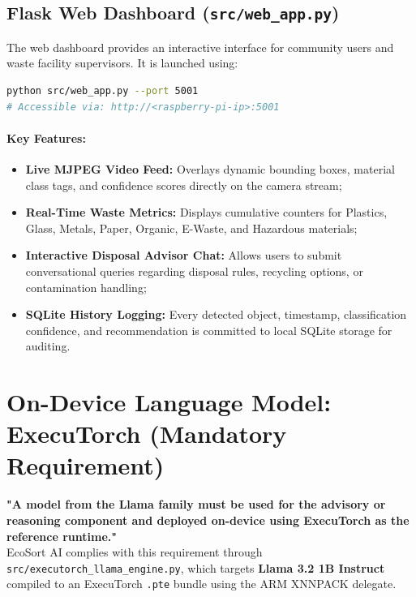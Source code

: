 \documentclass[12pt,a4paper]{article}
\begin{document}
\subsection{Flask Web Dashboard (\texttt{src/web\_app.py})}

The web dashboard provides an interactive interface for community users and waste facility
supervisors. It is launched using:
\begin{lstlisting}[language=bash]
python src/web_app.py --port 5001
# Accessible via: http://<raspberry-pi-ip>:5001
\end{lstlisting}

\paragraph{Key Features:}
\begin{itemize}[noitemsep]
  \item \textbf{Live MJPEG Video Feed:} Overlays dynamic bounding boxes, material class tags,
  and confidence scores directly on the camera stream;
  \item \textbf{Real-Time Waste Metrics:} Displays cumulative counters for Plastics, Glass,
  Metals, Paper, Organic, E-Waste, and Hazardous materials;
  \item \textbf{Interactive Disposal Advisor Chat:} Allows users to submit conversational queries
  regarding disposal rules, recycling options, or contamination handling;
  \item \textbf{SQLite History Logging:} Every detected object, timestamp, classification confidence,
  and recommendation is committed to local SQLite storage for auditing.
\end{itemize}

\clearpage

\section{On-Device Language Model: ExecuTorch (Mandatory Requirement)}

\begin{reqbox}
\textbf{"A model from the Llama family must be used for the advisory or reasoning component
and deployed on-device using ExecuTorch as the reference runtime."}\\[4pt]
EcoSort AI complies with this requirement through \texttt{src/executorch\_llama\_engine.py},
which targets \textbf{Llama 3.2 1B Instruct} compiled to an ExecuTorch \texttt{.pte} bundle
using the ARM XNNPACK delegate.
\end{reqbox}
\end{document}

